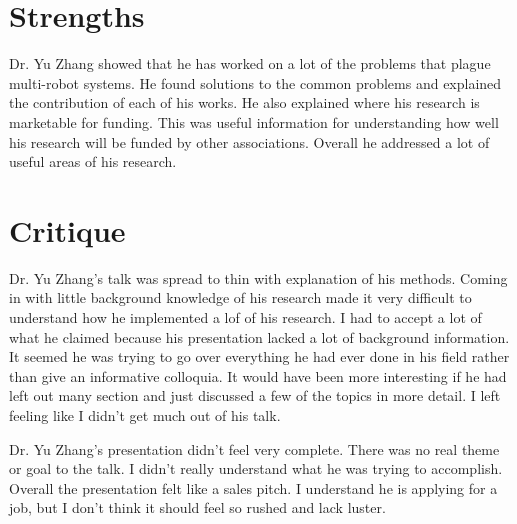 \documentclass{article}
\begin{document}
\section*{Strengths}
Dr. Yu Zhang showed that he has worked on a lot of the problems that plague multi-robot systems. He found solutions to the common problems and explained the contribution of each of his works. He also explained where his research is marketable for funding. This was useful information for understanding how well his research will be funded by other associations. Overall he addressed a lot of useful areas of his research.
\section*{Critique}
Dr. Yu Zhang's talk was spread to thin with explanation of his methods. Coming in with little background knowledge of his research made it very difficult to understand how he implemented a lof of his research. I had to accept a lot of what he claimed because his presentation lacked a lot of background information. It seemed he was trying to go over everything he had ever done in his field rather than give an informative colloquia. It would have been more interesting if he had left out many section and just discussed a few of the topics in more detail. I left feeling like I didn't get much out of his talk.

Dr. Yu Zhang's presentation didn't feel very complete. There was no real theme or goal to the talk. I didn't really understand what he was trying to accomplish. Overall the presentation felt like a sales pitch. I understand he is applying for a job, but I don't think it should feel so rushed and lack luster.
\end{document}
